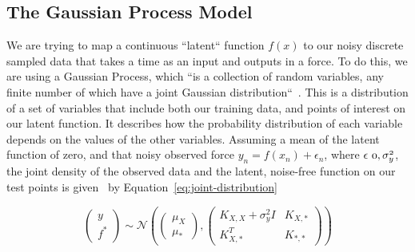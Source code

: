 \documentclass[12pt]{article}
\begin{document}
    \subsection{The Gaussian Process Model}
%
%

    We are trying to map a continuous ``latent`` function $f(x)$ to our noisy discrete sampled data that takes a time as an input and outputs in a force.
    To do this, we are using a Gaussian Process, which ``is a collection of random variables, any finite number of which have a joint Gaussian distribution``~\cite{rasmussen2006gaussian}.
    This is a distribution of a set of variables that include both our training data, and points of interest on our latent function.
    It describes how the probability distribution of each variable depends on the values of the other variables.
    Assuming a mean of the latent function of zero, and that noisy observed force $y_n = f(x_n)+\epsilon_n$, where $\epsilon ~ \mathnormal{0, \sigma^2_y}$, the joint density of the observed data and the latent, noise-free function on our test points is given~\cite{murphy2023probabilistic} by Equation~\ref{eq:joint-distribution}


    \begin{equation}
        \begin{pmatrix}
            y \\
            f^*
        \end{pmatrix}
        \sim \mathcal{N} \left(
        \begin{pmatrix}
            \mu_X \\
            \mu_*
        \end{pmatrix},
        \begin{pmatrix}
            K_{X,X} + \sigma^2_y I & K_{X,*} \\
            K_{X,*}^T & K_{*,*}
        \end{pmatrix}
        \right)\label{eq:joint-distribution}
    \end{equation}
\end{document}

